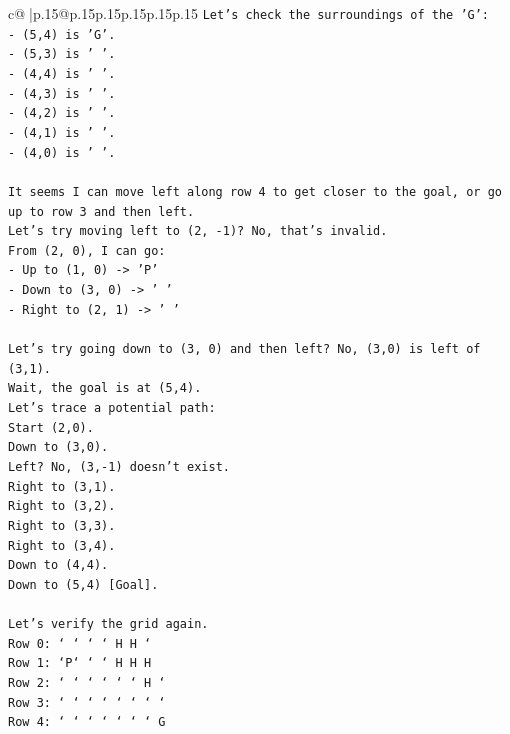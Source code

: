 \documentclass{article}
\begin{document}
{\begin{supertabular}{c@{$\;$}|p{.15\linewidth}@{}p{.15\linewidth}p{.15\linewidth}p{.15\linewidth}p{.15\linewidth}p{.15\linewidth}}
{{{\texttt{Let's check the surroundings of the 'G':} \\
\texttt{{-} (5,4) is 'G'.} \\
\texttt{{-} (5,3) is ' '.} \\
\texttt{{-} (4,4) is ' '.} \\
\texttt{{-} (4,3) is ' '.} \\
\texttt{{-} (4,2) is ' '.} \\
\texttt{{-} (4,1) is ' '.} \\
\texttt{{-} (4,0) is ' '.} \\
\\ 
\texttt{It seems I can move left along row 4 to get closer to the goal, or go up to row 3 and then left.} \\
\texttt{Let's try moving left to (2, {-}1)? No, that's invalid.} \\
\texttt{From (2, 0), I can go:} \\
\texttt{{-} Up to (1, 0) {-}> 'P'} \\
\texttt{{-} Down to (3, 0) {-}> ' '} \\
\texttt{{-} Right to (2, 1) {-}> ' '} \\
\\ 
\texttt{Let's try going down to (3, 0) and then left? No, (3,0) is left of (3,1).} \\
\texttt{Wait, the goal is at (5,4).} \\
\texttt{Let's trace a potential path:} \\
\texttt{Start (2,0).} \\
\texttt{Down to (3,0).} \\
\texttt{Left? No, (3,{-}1) doesn't exist.} \\
\texttt{Right to (3,1).} \\
\texttt{Right to (3,2).} \\
\texttt{Right to (3,3).} \\
\texttt{Right to (3,4).} \\
\texttt{Down to (4,4).} \\
\texttt{Down to (5,4) {[}Goal{]}.} \\
\\ 
\texttt{Let's verify the grid again.} \\
\texttt{Row 0: ` ` ` ` H H `} \\
\texttt{Row 1: `P` ` ` H H H} \\
\texttt{Row 2: ` ` ` ` ` ` H `} \\
\texttt{Row 3: ` ` ` ` ` ` ` `} \\
\texttt{Row 4: ` ` ` ` ` ` ` G} \\
}}}
\end{supertabular}}
\end{document}
